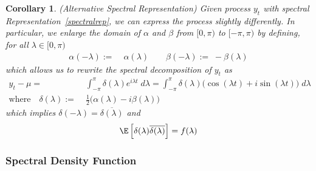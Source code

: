 \documentclass[12pt]{article}
\theoremstyle{plain}
\newtheorem{cor}[thm]{Corollary}
\theoremstyle{definition}
\theoremstyle{remark}
\begin{document}
\begin{cor}(\emph{Alternative Spectral Representation})
Given process $y_t$ with spectral Representation~\ref{spectralrep}, we
can express the process slightly differently. In particular, we
enlarge the domain of $\alpha$ and $\beta$ from $[0,\pi)$ to
$[-\pi,\pi)$ by defining, for all $\lambda \in[0,\pi)$
\begin{align*}
  \alpha(-\lambda) :=& \;\alpha(\lambda)
  \qquad
  \beta(-\lambda) := \;-\beta(\lambda)
\end{align*}
which allows us to rewrite the spectral decomposition of $y_t$ as
\begin{align*}
  y_t-\mu =&\; \int_{-\pi}^\pi \delta(\lambda)e^{i\lambda t}\;d\lambda
  =\int_{-\pi}^\pi
  \delta(\lambda)\big(\cos(\lambda t)+i\sin(\lambda t)\big)\;d\lambda
  \\
  \text{where}\quad
  \delta(\lambda) :=& \;
    \frac{1}{2}\big(\alpha(\lambda)-i\beta(\lambda)\big)
\end{align*}
which implies $\delta(-\lambda)=\overline{\delta(\lambda)}$ and
\begin{align*}
\E\left[\delta(\lambda)\overline{\delta(\lambda)}\right] = f(\lambda)
\end{align*}
\end{cor}


\clearpage
\subsubsection{Spectral Density Function}
\end{document}
